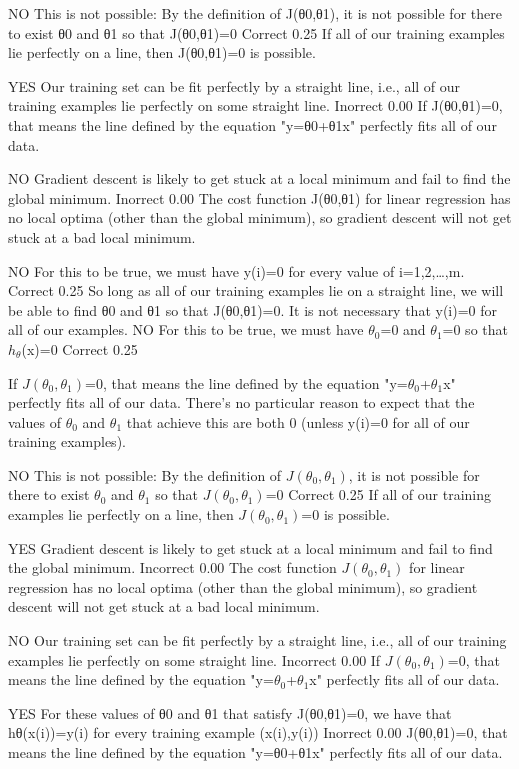 NO This is not possible: By the definition of J(θ0,θ1), it is not possible for there to exist θ0 and θ1 so that J(θ0,θ1)=0	Correct	0.25	If all of our training examples lie perfectly on a line, then J(θ0,θ1)=0 is possible.

YES Our training set can be fit perfectly by a straight line, i.e., all of our training examples lie perfectly on some straight line.	Inorrect	0.00	If J(θ0,θ1)=0, that means the line defined by the equation "y=θ0+θ1x" perfectly fits all of our data.

NO Gradient descent is likely to get stuck at a local minimum and fail to find the global minimum.	Inorrect	0.00	The cost function J(θ0,θ1) for linear regression has no local optima (other than the global minimum), so gradient descent will not get stuck at a bad local minimum.

NO For this to be true, we must have y(i)=0 for every value of i=1,2,…,m.	Correct	0.25	So long as all of our training examples lie on a straight line, we will be able to find θ0 and θ1 so that J(θ0,θ1)=0. It is not necessary that y(i)=0 for all of our examples.
NO For this to be true, we must have $\theta_0$=0 and $\theta_1$=0 so that $h_\theta$(x)=0	Correct	0.25	

If $J(\theta_0, \theta_1)$=0, that means the line defined by the equation "y=$\theta_0$+$\theta_1$x" perfectly fits all of our data. 
There's no particular reason to expect that the values of $\theta_0$ and $\theta_1$ that achieve this are both 0 (unless y(i)=0 for all of our training examples).

NO This is not possible: By the definition of $J(\theta_0, \theta_1)$, it is not possible for there to exist $\theta_0$ and $\theta_1$ so that $J(\theta_0, \theta_1)$=0	
   Correct	0.25	If all of our training examples lie perfectly on a line, then $J(\theta_0, \theta_1)$=0 is possible.

YES Gradient descent is likely to get stuck at a local minimum and fail to find the global minimum.	
   Incorrect	0.00	The cost function $J(\theta_0, \theta_1)$ for linear regression has no local optima (other than the global minimum), 
   so gradient descent will not get stuck at a bad local minimum.

NO Our training set can be fit perfectly by a straight line, i.e., all of our training examples lie perfectly on some straight line.	
   Incorrect	0.00	
   If $J(\theta_0, \theta_1)$=0, that means the line defined by the equation "y=$\theta_0$+$\theta_1$x" perfectly fits all
   of our data.

YES For these values of θ0 and θ1 that satisfy J(θ0,θ1)=0, we have that hθ(x(i))=y(i) for every training example (x(i),y(i))	Inorrect	0.00	J(θ0,θ1)=0, that means the line defined by the equation "y=θ0+θ1x" perfectly fits all of our data.
